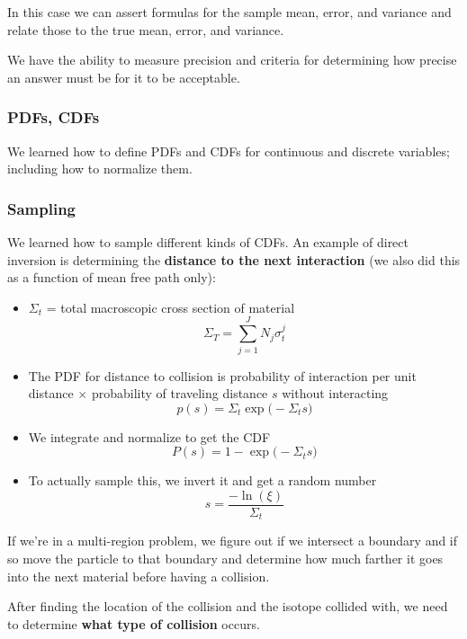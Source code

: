 \documentclass[12pt]{article}
\begin{document}
In this case we can assert formulas for the sample mean, error, and variance and relate those to the true mean, error, and variance. 

We have the ability to measure precision and criteria for determining how precise an answer must be for it to be acceptable. 


\subsubsection*{PDFs, CDFs}
We learned how to define PDFs and CDFs for continuous and discrete variables; including how to normalize them. 

\subsubsection*{Sampling}
We learned how to sample different kinds of CDFs. An example of direct inversion is determining the \textbf{distance to the next interaction} (we also did this as a function of mean free path only):

\begin{itemize}
\item $\Sigma_t$ = total macroscopic cross section of material
\[\Sigma_T = \sum_{j=1}^J N_j \sigma_t^j\]

\item The PDF for distance to collision is probability of interaction per unit distance $\times$ probability of traveling distance $s$ without interacting
\[p(s) = \Sigma_t \exp\bigl(-\Sigma_t s \bigr)\]

\item We integrate and normalize to get the CDF
\[P(s) = 1 - \exp\bigl(-\Sigma_t s \bigr)\]

\item To actually sample this, we invert it and get a random number
\[s = \frac{-\ln(\xi)}{\Sigma_t}\]
\end{itemize}
%
If we're in a multi-region problem, we figure out if we intersect a boundary and if so move the particle to that boundary and determine how much farther it goes into the next material before having a collision.

After finding the location of the collision and the isotope collided with, we need to determine \textbf{what type of collision} occurs. 
\end{document}
